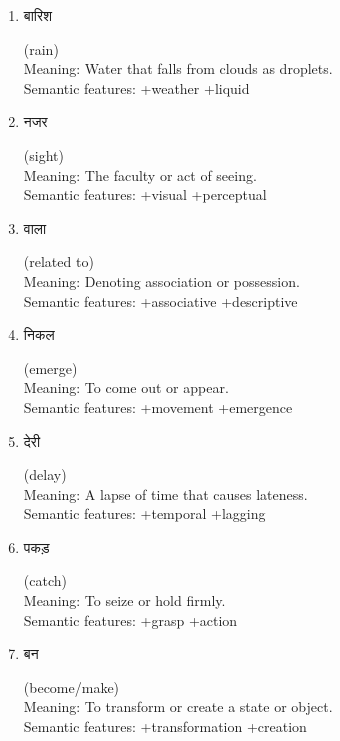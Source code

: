\documentclass{article}
\begin{document}
\begin{enumerate}
\item \begin{hindi} बारिश \end{hindi} (rain) \\
Meaning: Water that falls from clouds as droplets. \\
Semantic features: +weather +liquid

\item \begin{hindi} नजर \end{hindi} (sight) \\
Meaning: The faculty or act of seeing. \\
Semantic features: +visual +perceptual

\item \begin{hindi} वाला \end{hindi} (related to) \\
Meaning: Denoting association or possession. \\
Semantic features: +associative +descriptive

\item \begin{hindi} निकल \end{hindi} (emerge) \\
Meaning: To come out or appear. \\
Semantic features: +movement +emergence

\item \begin{hindi} देरी \end{hindi} (delay) \\
Meaning: A lapse of time that causes lateness. \\
Semantic features: +temporal +lagging

\item \begin{hindi} पकड़ \end{hindi} (catch) \\
Meaning: To seize or hold firmly. \\
Semantic features: +grasp +action

\item \begin{hindi} बन \end{hindi} (become/make) \\
Meaning: To transform or create a state or object. \\
Semantic features: +transformation +creation


\end{enumerate}
\end{document}
